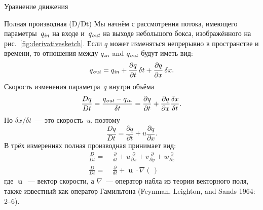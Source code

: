 \begin{chapter}{Уравнение движения}
\begin{section}{Полная производная (D/Dt)}
Мы начнём с рассмотрения потока, имеющего параметры~$q_{\text{\textit{in}}}$ на входе и~$q_{\text{\textit{out}}}$
на выходе небольшого бокса, изображённого на рис.~\ref{fig:derivativesketch}.
Если $q$ может изменяться непрерывно в пространстве и времени, то
отношения между $q_{\text{\textit{in}}}$ and $q_{\text{\textit{out}}}$ будут иметь вид:
\begin{equation}
q_{\text{\textit{out}}} = q_{\text{\textit{in}}} + \frac{\partial{q}}{\partial{t}}\,\delta{t} 
             + \frac{\partial{q}}{\partial{x}}\,\delta{x}.
\end{equation}
Скорость изменения параметра~$q$ внутри объёма
\begin{equation}
\frac{Dq}{Dt} = \frac{q_{\text{\textit{out}}} - q_{\text{\textit{in}}}}{\delta{t}}
              = \frac{\partial{q}}{\partial{t}} 
                + \frac{\partial{q}}{\partial{x}}\frac{\delta{x}}{\delta{t}}.
\end{equation}
Но $\delta x /\delta t$~--- это скорость~$u$, поэтому
\begin{displaymath}
\frac{Dq}{Dt} = \frac{\partial{q}}{\partial{t}} 
                + u\frac{\partial{q}}{\partial{x}}.
\end{displaymath}
В трёх измерениях полная производная принимает вид:
\begin{subequations}\label{eq:7.7}
\begin{align}
\frac{D}{Dt} = & \:\frac{\partial}{dt} + u\frac{\partial}{\partial{x}} 
                                       + v\frac{\partial}{\partial y} 
                                       + w\frac{\partial}{\partial z} \\
\frac{D}{Dt} = & \:\frac{\partial}{dt} + \mbfu \cdot \nabla(\,)
\end{align}
\end{subequations}
где $\mbfu$~--- вектор скорости, а $\nabla$~--- оператор набла из теории
векторного поля, также известный как оператор Гамильтона (Feynman, Leighton, and Sands 1964: 2--6).
%

\end{section}
\end{chapter}
